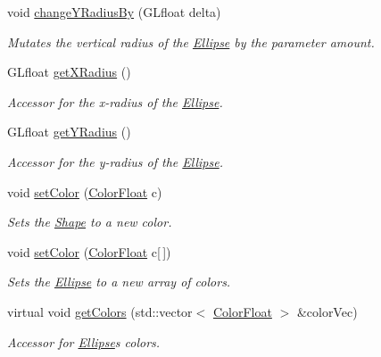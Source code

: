 \begin{DoxyCompactItemize}
void \hyperlink{classtsgl_1_1_ellipse_a07c8ee9a4433de42a1b70f6a02385b91}{change\+Y\+Radius\+By} (G\+Lfloat delta)
\begin{DoxyCompactList}\small\item\em Mutates the vertical radius of the \hyperlink{classtsgl_1_1_ellipse}{Ellipse} by the parameter amount. \end{DoxyCompactList}\item 
G\+Lfloat \hyperlink{classtsgl_1_1_ellipse_ad3e100cf6e0cb429a3be1e5162c4aa61}{get\+X\+Radius} ()
\begin{DoxyCompactList}\small\item\em Accessor for the x-\/radius of the \hyperlink{classtsgl_1_1_ellipse}{Ellipse}. \end{DoxyCompactList}\item 
G\+Lfloat \hyperlink{classtsgl_1_1_ellipse_ab4371a2fae21b7fb874a4f5232e92f40}{get\+Y\+Radius} ()
\begin{DoxyCompactList}\small\item\em Accessor for the y-\/radius of the \hyperlink{classtsgl_1_1_ellipse}{Ellipse}. \end{DoxyCompactList}\item 
void \hyperlink{classtsgl_1_1_ellipse_afb71964e56fdd50e49ba46e8090aa858}{set\+Color} (\hyperlink{structtsgl_1_1_color_float}{Color\+Float} c)
\begin{DoxyCompactList}\small\item\em Sets the \hyperlink{classtsgl_1_1_shape}{Shape} to a new color. \end{DoxyCompactList}\item 
void \hyperlink{classtsgl_1_1_ellipse_a052ef5a609d7e8516d973ddc9e549c89}{set\+Color} (\hyperlink{structtsgl_1_1_color_float}{Color\+Float} c\mbox{[}$\,$\mbox{]})
\begin{DoxyCompactList}\small\item\em Sets the \hyperlink{classtsgl_1_1_ellipse}{Ellipse} to a new array of colors. \end{DoxyCompactList}\item 
virtual void \hyperlink{classtsgl_1_1_ellipse_a3d92da146589fc58112945daefafe98f}{get\+Colors} (std\+::vector$<$ \hyperlink{structtsgl_1_1_color_float}{Color\+Float} $>$ \&color\+Vec)
\begin{DoxyCompactList}\small\item\em Accessor for \hyperlink{classtsgl_1_1_ellipse}{Ellipse}\textquotesingle{}s colors. \end{DoxyCompactList}\end{DoxyCompactItemize}
